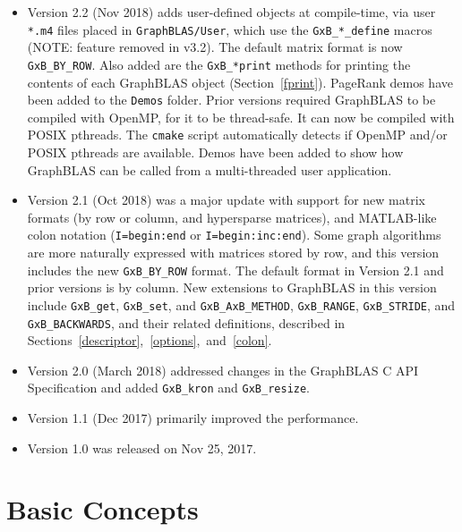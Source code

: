 \documentclass[12pt]{article}
\begin{document}
\begin{itemize}
\item
Version 2.2 (Nov 2018)
adds user-defined objects at compile-time, via user \verb'*.m4' files placed in
\verb'GraphBLAS/User', which use the \verb'GxB_*_define' macros 
(NOTE: feature removed in v3.2).
The default matrix format is now \verb'GxB_BY_ROW'.
Also added are the \verb'GxB_*print' methods for printing the contents of each
GraphBLAS object (Section~\ref{fprint}).   PageRank demos have been added to
the \verb'Demos' folder.
Prior versions required GraphBLAS to be compiled with OpenMP, for it to be
thread-safe.  It can now be compiled with POSIX pthreads.  The \verb'cmake'
script automatically detects if OpenMP and/or POSIX pthreads are available.
Demos have been added to show how GraphBLAS can be called from a multi-threaded
user application.

\item
Version 2.1 (Oct 2018) was
a major update with support for new matrix formats
(by row or column, and hypersparse matrices), and MATLAB-like colon notation
(\verb'I=begin:end' or \verb'I=begin:inc:end').  Some graph algorithms are more
naturally expressed with matrices stored by row, and this version includes the
new \verb'GxB_BY_ROW' format.  The default format in Version 2.1 and
prior versions is by column.
New extensions to GraphBLAS in this version include \verb'GxB_get',
\verb'GxB_set', and \verb'GxB_AxB_METHOD', \verb'GxB_RANGE', \verb'GxB_STRIDE',
and \verb'GxB_BACKWARDS', and their related definitions, described in
Sections~\ref{descriptor},~\ref{options},~and~\ref{colon}.

\item
Version 2.0 (March 2018) addressed changes in the GraphBLAS C API
Specification and added \verb'GxB_kron' and \verb'GxB_resize'.

\item
Version 1.1 (Dec 2017) primarily improved the performance.

\item
Version 1.0 was released on Nov 25, 2017.
\end{itemize}


\newpage
\section{Basic Concepts} %
\label{basic}
\end{document}
